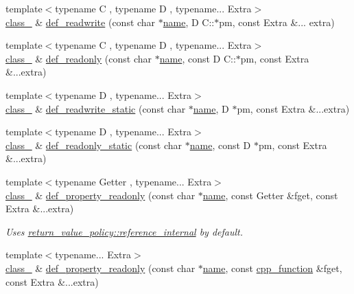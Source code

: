 \begin{DoxyCompactItemize}
{\footnotesize template$<$typename C , typename D , typename... Extra$>$ }\\\mbox{\hyperlink{classclass__}{class\+\_\+}} \& \mbox{\hyperlink{classclass___a3018817da2690cc989745c7d744438cb}{def\+\_\+readwrite}} (const char $\ast$\mbox{\hyperlink{structname}{name}}, D C\+::$\ast$pm, const Extra \&... extra)
\item 
{\footnotesize template$<$typename C , typename D , typename... Extra$>$ }\\\mbox{\hyperlink{classclass__}{class\+\_\+}} \& \mbox{\hyperlink{classclass___ac98b5db2ad54da585cc9d28a8748e420}{def\+\_\+readonly}} (const char $\ast$\mbox{\hyperlink{structname}{name}}, const D C\+::$\ast$pm, const Extra \&...extra)
\item 
{\footnotesize template$<$typename D , typename... Extra$>$ }\\\mbox{\hyperlink{classclass__}{class\+\_\+}} \& \mbox{\hyperlink{classclass___ab5f2fa205966fb138364019ff23d96de}{def\+\_\+readwrite\+\_\+static}} (const char $\ast$\mbox{\hyperlink{structname}{name}}, D $\ast$pm, const Extra \&...extra)
\item 
{\footnotesize template$<$typename D , typename... Extra$>$ }\\\mbox{\hyperlink{classclass__}{class\+\_\+}} \& \mbox{\hyperlink{classclass___aaa095752a8d0fc1bd45e4404502df5e9}{def\+\_\+readonly\+\_\+static}} (const char $\ast$\mbox{\hyperlink{structname}{name}}, const D $\ast$pm, const Extra \&...extra)
\item 
{\footnotesize template$<$typename Getter , typename... Extra$>$ }\\\mbox{\hyperlink{classclass__}{class\+\_\+}} \& \mbox{\hyperlink{classclass___a0b005f5ca971191308806807682cdf94}{def\+\_\+property\+\_\+readonly}} (const char $\ast$\mbox{\hyperlink{structname}{name}}, const Getter \&fget, const Extra \&...extra)
\begin{DoxyCompactList}\small\item\em Uses \mbox{\hyperlink{detail_2common_8h_adde72ab1fb0dd4b48a5232c349a53841aa39bc0596cb125c1605a78fbd287df7f}{return\+\_\+value\+\_\+policy\+::reference\+\_\+internal}} by default. \end{DoxyCompactList}\item 
{\footnotesize template$<$typename... Extra$>$ }\\\mbox{\hyperlink{classclass__}{class\+\_\+}} \& \mbox{\hyperlink{classclass___ac7f87d627ffe20ca113b2c42eb746d45}{def\+\_\+property\+\_\+readonly}} (const char $\ast$\mbox{\hyperlink{structname}{name}}, const \mbox{\hyperlink{classcpp__function}{cpp\+\_\+function}} \&fget, const Extra \&...extra)

\end{DoxyCompactItemize}
